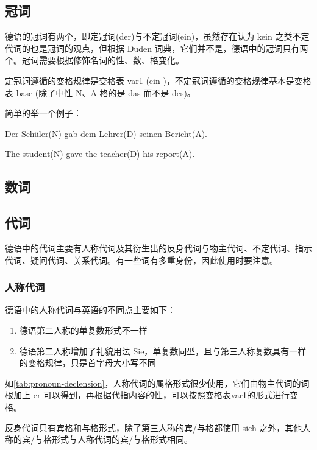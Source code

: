 \subsection{冠词}

德语的冠词有两个，即定冠词(der)与不定冠词(ein)，虽然存在认为 kein 之类不定代词的也是冠词的观点，但根据 Duden 词典，它们并不是，德语中的冠词只有两个。冠词需要根据修饰名词的性、数、格变化。

定冠词遵循的变格规律是变格表 var1 (ein-)，不定冠词遵循的变格规律基本是变格表 base (除了中性 N、A 格的是 das 而不是 des)。

简单的举一个例子：

Der Schüler(N) gab dem Lehrer(D) seinen Bericht(A).

The student(N) gave the teacher(D) his report(A).

\subsection{数词}


\subsection{代词}

德语中的代词主要有人称代词及其衍生出的反身代词与物主代词、不定代词、指示代词、疑问代词、关系代词。有一些词有多重身份，因此使用时要注意。

\subsubsection{人称代词}

德语中的人称代词与英语的不同点主要如下：
\begin{enumerate}[leftmargin=3.5em, topsep=0pt, itemsep=0pt, parsep=0pt]
    \item 德语第二人称的单复数形式不一样
    \item 德语第二人称增加了礼貌用法 Sie，单复数同型，且与第三人称复数具有一样的变格规律，只是首字母大小写不同
\end{enumerate}

如\cref{tab:pronoun-declension}，人称代词的属格形式很少使用，它们由物主代词的词根加上 er 可以得到，再根据代指内容的性，可以按照变格表var1的形式进行变格。

反身代词只有宾格和与格形式，除了第三人称的宾/与格都使用 sich 之外，其他人称的宾/与格形式与人称代词的宾/与格形式相同。

